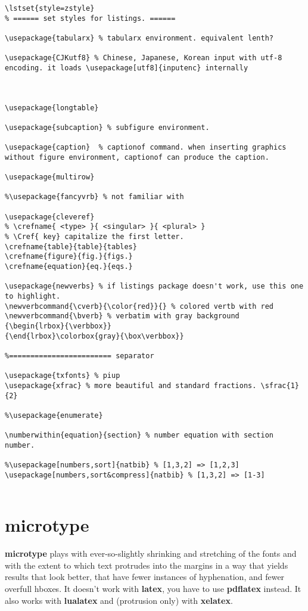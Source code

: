 \begin{lstlisting}[language={[LaTex]Tex}]
\lstset{style=zstyle}
% ====== set styles for listings. ======

\usepackage{tabularx} % tabularx environment. equivalent lenth?

\usepackage{CJKutf8} % Chinese, Japanese, Korean input with utf-8 encoding. it loads \usepackage[utf8]{inputenc} internally



\usepackage{longtable}

\usepackage{subcaption} % subfigure environment.

\usepackage{caption}  % captionof command. when inserting graphics without figure environment, captionof can produce the caption.

\usepackage{multirow}

%\usepackage{fancyvrb} % not familiar with

\usepackage{cleveref}
% \crefname{ <type> }{ <singular> }{ <plural> }
% \Cref{ key} capitalize the first letter.
\crefname{table}{table}{tables} 
\crefname{figure}{fig.}{figs.}
\crefname{equation}{eq.}{eqs.}

\usepackage{newverbs} % if listings package doesn't work, use this one to highlight.
\newverbcommand{\cverb}{\color{red}}{} % colored vertb with red
\newverbcommand{\bverb}	% verbatim with gray background
{\begin{lrbox}{\verbbox}}
{\end{lrbox}\colorbox{gray}{\box\verbbox}}

%======================== separator

\usepackage{txfonts} % piup
\usepackage{xfrac} % more beautiful and standard fractions. \sfrac{1}{2}

%\usepackage{enumerate}

\numberwithin{equation}{section} % number equation with section number.

%\usepackage[numbers,sort]{natbib} % [1,3,2] => [1,2,3]
\usepackage[numbers,sort&compress]{natbib} % [1,3,2] => [1-3]


\end{lstlisting}

\section{microtype}
\textbf{microtype} plays with ever-so-slightly shrinking and stretching of the fonts and with the extent to which text protrudes into the margins in a way that yields results that look better, that have fewer instances of hyphenation, and fewer overfull hboxes. It doesn't work with \textbf{latex}, you have to use \textbf{pdflatex} instead. It also works with \textbf{lualatex} and (protrusion only) with \textbf{xelatex}.


